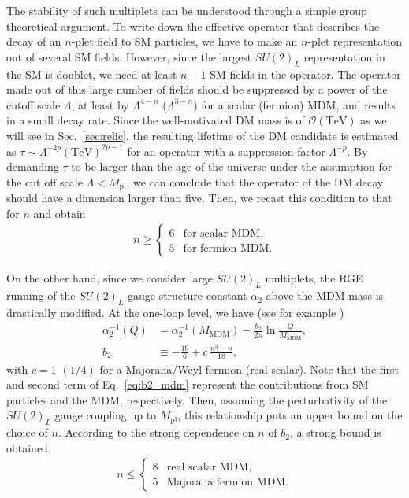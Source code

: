 \documentclass[12pt,twoside,book]{article}
\begin{document}
The stability of such multiplets can be understood through a simple group theoretical argument.
To write down the effective operator that describes the decay of an $n$-plet field to SM particles, we have to make an $n$-plet representation out of several SM fields.
However, since the largest $SU(2)_L$ representation in the SM is doublet, we need at least $n-1$ SM fields in the operator.
The operator made out of this large number of fields should be suppressed by a power of the cutoff scale $\Lambda$, at least by $\Lambda^{4-n}$ ($\Lambda^{3-n}$) for a scalar (fermion) MDM, and results in a small decay rate.
Since the well-motivated DM mass is of $\mathcal{O} (\mathrm{TeV})$ as we will see in Sec.~\ref{sec:relic}, the resulting lifetime of the DM candidate is estimated as $\tau \sim \Lambda^{-2p} (\mathrm{TeV})^{2p-1}$ for an operator with a suppression factor $\Lambda^{-p}$.
By demanding $\tau$ to be larger than the age of the universe under the assumption for the cut off scale $\Lambda < M_{\mathrm{pl}}$, we can conclude that the operator of the DM decay should have a dimension larger than five.
Then, we recast this condition to that for $n$ and obtain
\begin{align}
  n \geq
  \begin{cases}
    6 & \text{for scalar MDM},\\
    5 & \text{for fermion MDM}.
  \end{cases}
\end{align}

On the other hand, since we consider large $SU(2)_L$ multiplets, the RGE running of the $SU(2)_L$ gauge structure constant $\alpha_2$ above the MDM mass is drastically modified.
At the one-loop level, we have (see for example \cite{Machacek:1983tz})
\begin{align}
  \alpha_2^{-1} (Q) &= \alpha_2^{-1} (M_{\mathrm{MDM}}) - \frac{b_2}{2\pi} \ln \frac{Q}{M_{\mathrm{MDM}}},\\
  b_2 &\equiv -\frac{19}{6} + c\, \frac{n^3 - n}{18},
  \label{eq:b2_mdm}
\end{align}
with $c = 1$ $(1/4)$ for a Majorana/Weyl fermion (real scalar).
Note that the first and second term of Eq.~\eqref{eq:b2_mdm} represent the contributions from SM particles and the MDM, respectively.
Then, assuming the perturbativity of the $SU(2)_L$ gauge coupling up to $M_{\mathrm{pl}}$, this relationship puts an upper bound on the choice of $n$.
According to the strong dependence on $n$ of $b_2$, a strong bound is obtained,
\begin{align}
  n \leq
  \begin{cases}
    8 & \text{real scalar MDM},\\
    5 & \text{Majorana fermion MDM}.
  \end{cases}
\end{align}
\end{document}
